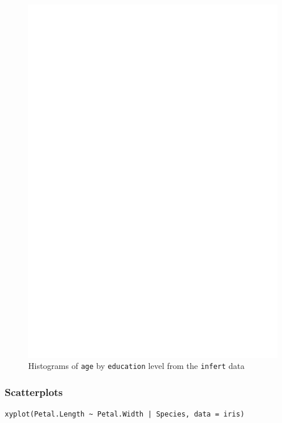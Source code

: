 \documentclass[captions=tableheading]{scrbook}
\begin{document}
\begin{figure}[th]
  \includegraphics[angle=270, totalheight=4in]{ps/histograms-lattice.ps}
  \caption[Histograms of \texttt{age} by \texttt{education} level]{Histograms of \texttt{age} by \texttt{education} level from the \texttt{infert} data}
  \label{fig:histograms-lattice}
\end{figure}
\subsubsection{Scatterplots}
\label{sec-2-6-3-3}



\begin{verbatim}
xyplot(Petal.Length ~ Petal.Width | Species, data = iris)
\end{verbatim}
\end{document}

